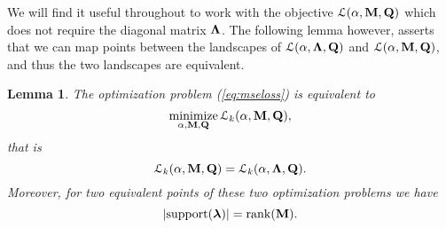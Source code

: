 \documentclass[11pt]{article}
\theoremstyle{plain}
\newtheorem{lemma}{Lemma}
\DeclareMathOperator*{\minimize}{minimize}
\DeclareMathOperator*{\rank}{rank}
\DeclareMathOperator*{\supp}{support}
\theoremstyle{plain}
\numberwithin{equation}{section}
\numberwithin{lemma}{section}
\numberwithin{theorem}{section}
\numberwithin{corollary}{section}
\numberwithin{observation}{section}
\numberwithin{definition}{section}
\numberwithin{example}{section}
\begin{document}
We will find it useful throughout to work with the objective $\mathcal{L}(\alpha, \Mx{M},\Mx{Q})$ which does not require the diagonal matrix $\Mx{\Lambda}$.  The following lemma however, asserts that we can map points between the landscapes of $\mathcal{L}(\alpha, \Mx{\Lambda},\Mx{Q})$ and $\mathcal{L}(\alpha, \Mx{M},\Mx{Q})$, and thus the two landscapes are equivalent.
\begin{lemma} \label{lem:equivalence} The optimization problem (\ref{eq:mseloss}) is equivalent to 
\begin{equation}
    \minimize_{\alpha,\Mx{M}, \Mx{Q}} \mathcal{L}_k(\alpha,\Mx{M},\Mx{Q}),
\end{equation}
that is
\[
\mathcal{L}_k(\alpha,\Mx{M},\Mx{Q}) = \mathcal{L}_k(\alpha,\Mx{\Lambda},\Mx{Q}).
\]
Moreover, for two equivalent points of these two optimization problems we have 
\[
\left|\supp(\Mx{\lambda})\right| = \rank(\Mx{M}).
\]

\end{lemma}
\end{document}
